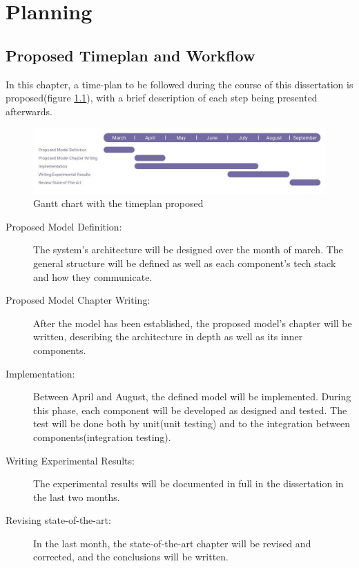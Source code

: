 
%

\chapter{Planning}
\label{cha:Planning}

\section{Proposed Timeplan and Workflow}
In this chapter, a time-plan to be followed during the course of this
dissertation is proposed(figure \ref{fig:timeplan}), with a brief description
of each step being presented afterwards.

\begin{figure}[htbp]
	\centering
	\includegraphics[width=\textwidth]{Chapters/Figures/Planning/Planning.jpeg}
	\caption{Gantt chart with the timeplan proposed}
	\label{fig:timeplan}
\end{figure}

\begin{description}
	\item[Proposed Model Definition:] The system's architecture will be designed
	      over the month of march. The general structure will be defined as well as
	      each component's tech stack and how they communicate.
	\item[Proposed Model Chapter Writing:]  After the model has been established,
	      the proposed model's chapter will be written, describing the architecture
	      in depth as well as its inner components.
	\item[Implementation:] Between April and August, the defined model will be
	      implemented. During this phase, each component will be developed as designed
	      and tested. The test will be done both by unit(unit testing) and to the
	      integration between components(integration testing).
	\item[Writing Experimental Results:] The experimental results will be
	      documented in full in the dissertation in the last two months.
	\item[Revising state-of-the-art:] In the last month, the state-of-the-art
	      chapter will be revised and corrected, and the conclusions will be written.
\end{description}


